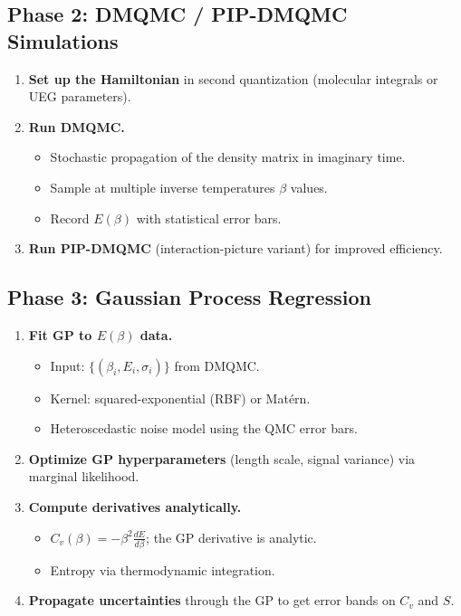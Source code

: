 \documentclass[11pt,a4paper]{article}
\begin{document}
\subsection{Phase 2: DMQMC / PIP-DMQMC Simulations}
\begin{enumerate}[label=\textbf{2.\arabic*}]
  \item \textbf{Set up the Hamiltonian} in second quantization (molecular integrals or UEG parameters).
  \item \textbf{Run DMQMC.}
    \begin{itemize}
      \item Stochastic propagation of the density matrix in imaginary time.
      \item Sample at multiple inverse temperatures $\beta$ values.
      \item Record $E(\beta)$ with statistical error bars.
    \end{itemize}
  \item \textbf{Run PIP-DMQMC} (interaction-picture variant) for improved efficiency.
\end{enumerate}

\subsection{Phase 3: Gaussian Process Regression}
\begin{enumerate}[label=\textbf{3.\arabic*}]
  \item \textbf{Fit GP to $E(\beta)$ data.}
    \begin{itemize}
      \item Input: $\{(\beta_i, E_i, \sigma_i)\}$ from DMQMC.
      \item Kernel: squared-exponential (RBF) or Mat\'{e}rn.
      \item Heteroscedastic noise model using the QMC error bars.
    \end{itemize}
  \item \textbf{Optimize GP hyperparameters} (length scale, signal variance) via marginal likelihood.
  \item \textbf{Compute derivatives analytically.}
    \begin{itemize}
      \item $C_v(\beta) = -\beta^2 \frac{dE}{d\beta}$; the GP derivative is analytic.
      \item Entropy via thermodynamic integration.
    \end{itemize}
  \item \textbf{Propagate uncertainties} through the GP to get error bands on $C_v$ and $S$.
\end{enumerate}
\end{document}
